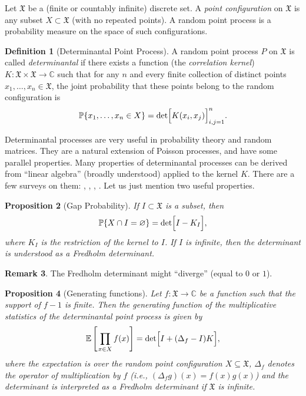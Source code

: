 \documentclass[letterpaper,11pt,oneside,reqno]{article}
\numberwithin{equation}{section}
\newcommand{\ssp}{\hspace{1pt}}
\newtheorem{proposition}{Proposition}[section]
\theoremstyle{definition}
\newtheorem{definition}[proposition]{Definition}
\newtheorem{remark}[proposition]{Remark}
\begin{document}
Let $\mathfrak{X}$ be a (finite or countably infinite)
discrete set. A \emph{point configuration} on $\mathfrak{X}$
is any subset $X\subset\mathfrak{X}$ (with no repeated
points). A random point process is a probability measure on
the space of such configurations.

\begin{definition}[Determinantal Point Process]
A random point process $P$ on $\mathfrak{X}$ is called
\emph{determinantal} if there exists a function (the
\emph{correlation kernel})
$K:\mathfrak{X}\times\mathfrak{X}\to\mathbb{C}$ such that
for any $n$ and every finite collection of distinct points
$x_1,\dots,x_n\in \mathfrak{X}$, the joint probability that
these points belong to the random configuration is
\[
\operatorname{\mathbb{P}}\{x_1,\dots,x_n\in X\}=\det\Bigl[K(x_i,x_j)\Bigr]_{i,j=1}^n.
\]
\end{definition}

Determinantal processes are very useful in probability theory and random matrices.
They are a natural extension of Poisson processes, and have some parallel properties.
Many properties of determinantal processes can be derived from ``linear algebra'' (broadly
understood) applied to the kernel $K$.
There are a few surveys on them:
\cite{Soshnikov2000}, \cite{peres2006determinantal},
\cite{Borodin2009}, 
\cite{kulesza2012determinantal}.
Let us just mention two useful properties.

\begin{proposition}[Gap Probability]
	If $I\subset\mathfrak{X}$ is a subset, then 
	\[
	\operatorname{\mathbb{P}}\{X\cap I=\varnothing\}=\det\Bigl[I-K_I\Bigr],
	\]
	where $K_I$ is the restriction of the kernel to $I$. 
	If $I$ is infinite, then the determinant is understood as a 
	Fredholm determinant.
\end{proposition}
\begin{remark}
	The Fredholm determinant
	might ``diverge'' (equal to $0$ or $1$).	
\end{remark}

\begin{proposition}[Generating functions]
	\label{prop:gen-func}
	Let $f:\mathfrak{X}\to\mathbb{C}$ be a function such that the support of $f-1$ is finite. Then the generating function of the multiplicative statistics of the determinantal point process is given by
	\[
	\mathbb{E}\left[\ssp\prod_{x\in X} f(x)\right] 
	=\det\Bigl[I + (\Delta_f - I)K\Bigr],
	\]
	where the expectation is over the random point configuration $X\subseteq\mathfrak{X}$,
	$\Delta_f$ denotes the operator of multiplication by $f$ (i.e., $(\Delta_f g)(x)=f(x)g(x)$)
	and the determinant is interpreted as a Fredholm determinant if $\mathfrak{X}$ is infinite.
\end{proposition}
\end{document}
